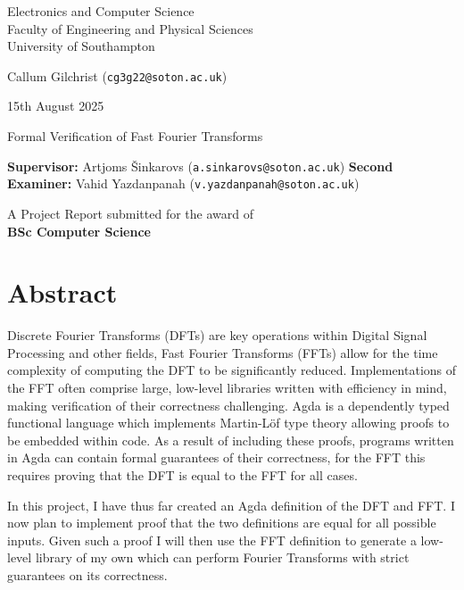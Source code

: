 \documentclass[12pt, twoside]{article}
\begin{document}
\thispagestyle{fancy}
\begin{center}
    \vspace*{20mm}
    \Large
    Electronics and Computer Science \\
    Faculty of Engineering and Physical Sciences \\
    University of Southampton 

    
    \vspace*{20mm}
    \Large Callum Gilchrist (\verb|cg3g22@soton.ac.uk|)
    
    \large 15th August 2025
    
    \vspace*{20mm}
    \Huge Formal Verification of Fast Fourier Transforms
    \vspace*{60mm}
    
    \large \textbf{Supervisor:} Artjoms Šinkarovs (\verb|a.sinkarovs@soton.ac.uk|)
    \large \textbf{Second Examiner:} Vahid Yazdanpanah (\verb|v.yazdanpanah@soton.ac.uk|)

    \vspace*{10mm}
    \normalsize A Project Report submitted for the award of \\
    \large \textbf{BSc Computer Science}
    
    \vspace*{10mm}
    
\end{center}
\clearpage
{}
\section*{Abstract}
Discrete Fourier Transforms (DFTs) are key operations within Digital Signal Processing and other fields, Fast Fourier Transforms (FFTs) allow for the time complexity of computing the DFT to be significantly reduced. 
Implementations of the FFT often comprise large, low-level libraries written with efficiency in mind, making verification of their correctness challenging.
Agda is a dependently typed functional language which implements Martin-Löf type theory allowing proofs to be embedded within code.
As a result of including these proofs, programs written in Agda can contain formal guarantees of their correctness, for the FFT this requires proving that the DFT is equal to the FFT for all cases.


In this project, I have thus far created an Agda definition of the DFT and FFT.
I now plan to implement proof that the two definitions are equal for all possible inputs.
Given such a proof I will then use the FFT definition to generate a low-level library of my own which can perform Fourier Transforms with strict guarantees on its correctness.
\end{document}

